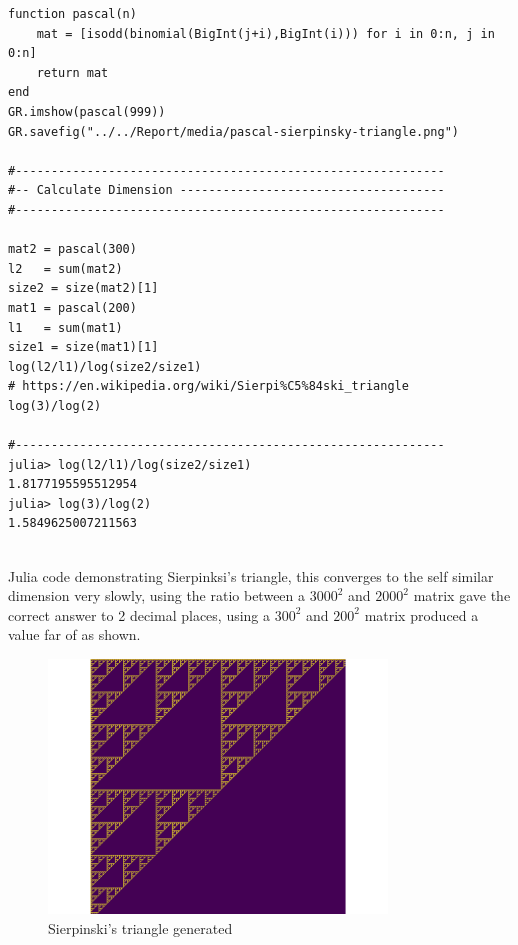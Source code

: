 \documentclass[a4paper,11pt,twoside]{article}
\begin{document}
 \newpage 
\begin{listing}[htbp]
\begin{verbatim}
function pascal(n)
    mat = [isodd(binomial(BigInt(j+i),BigInt(i))) for i in 0:n, j in 0:n]
    return mat
end
GR.imshow(pascal(999))
GR.savefig("../../Report/media/pascal-sierpinsky-triangle.png")

#------------------------------------------------------------
#-- Calculate Dimension -------------------------------------
#------------------------------------------------------------

mat2 = pascal(300)
l2   = sum(mat2)
size2 = size(mat2)[1]
mat1 = pascal(200)
l1   = sum(mat1)
size1 = size(mat1)[1]
log(l2/l1)/log(size2/size1)
# https://en.wikipedia.org/wiki/Sierpi%C5%84ski_triangle
log(3)/log(2)

#------------------------------------------------------------
julia> log(l2/l1)/log(size2/size1)
1.8177195595512954
julia> log(3)/log(2)
1.5849625007211563


\end{verbatim}
\caption{\label{pascal-triangle-sierpinski}Julia code demonstrating Sierpinksi's triangle, this converges to the self similar dimension very slowly, using the ratio between a \(3000^{2}\) and \(2000^{2}\) matrix gave the correct answer to 2 decimal places, using a \(300^{2}\) and \(200^{2}\) matrix produced a value far of as shown.}
\end{listing}

\begin{figure}[htbp]
\centering
\includegraphics[width=9cm]{media/pascal-sierpinsky-triangle.png}
\caption{\label{fig:pascal-sierpinsky}Sierpinski's triangle generated}
\end{figure}
\end{document}
